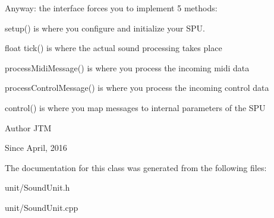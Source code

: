 Anyway\+: the interface forces you to implement 5 methods\+:


\begin{DoxyItemize}
\item setup() is where you configure and initialize your S\+PU.
\item float tick() is where the actual sound processing takes place
\item process\+Midi\+Message() is where you process the incoming midi data
\item process\+Control\+Message() is where you process the incoming control data
\item control() is where you map messages to internal parameters of the S\+PU
\end{DoxyItemize}

\begin{DoxyAuthor}{Author}
J\+TM 
\end{DoxyAuthor}
\begin{DoxySince}{Since}
April, 2016 
\end{DoxySince}


The documentation for this class was generated from the following files\+:\begin{DoxyCompactItemize}
\item 
unit/Sound\+Unit.\+h\item 
unit/Sound\+Unit.\+cpp\end{DoxyCompactItemize}
